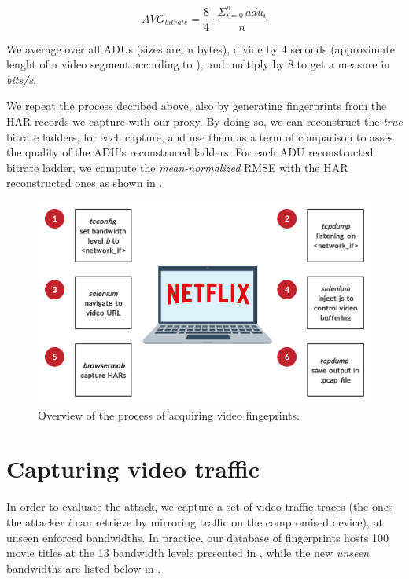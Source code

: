 \begin{equation*}
    AVG_{bitrate} = \dfrac{8}{4} \cdot \dfrac{\Sigma_{i=0}^{n} \hspace{2pt} adu_i}{n}
\end{equation*}

We average over all ADUs (sizes are in bytes), divide by 4 seconds (approximate
lenght of a video segment according to \cite{netflix-real-time}), and multiply
by 8 to get a measure in \emph{bits/s}. 

We repeat the process decribed above, also by generating fingerprints from the
HAR records we capture with our proxy. By doing so, we can reconstruct the
\emph{true} bitrate ladders, for each capture, and use them as a term of
comparison to asses the quality of the ADU's reconstruced ladders. For each
ADU reconstructed bitrate ladder, we compute the \emph{mean-normalized} RMSE
with the HAR reconstructed ones as shown in .

\begin{figure}[!h]
  \centering
  \includegraphics[width=\columnwidth]{img/fingerprints.png}
  \caption{Overview of the process of acquiring video fingeprints.}
  \label{fig:fingerprints}
\end{figure}


\section{Capturing video traffic}\label{sec:testing}

In order to evaluate the attack, we capture a set of video traffic traces (the
ones the attacker $i$ can retrieve by mirroring traffic on the compromised
device), at unseen enforced bandwidths. In practice, our database of
fingerprints hosts 100 movie titles at the 13 bandwidth levels presented in
, while the new \emph{unseen} bandwidths are listed below
in .

